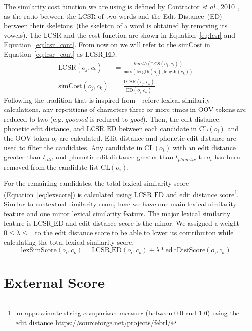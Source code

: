 \documentclass[a4paper,onesided,12pt]{report}
\begin{document}
The similarity cost function we are using is defined by Contractor \textit{et al.}, 2010~\cite{Contractor:2010:UCN:1944566.1944588}, as the ratio between the LCSR of two words and the Edit Distance~(ED) between their skeletons~(the skeleton of a word is obtained by removing its vowels). The LCSR and the cost function are shown in Equation~\ref{eq:lcsr} and Equation~\ref{eq:lcsr_cont}. From now on we will refer to the simCost in Equation~\ref{eq:lcsr_cont} as $\text{LCSR\_ED}$.
\begin{align}
\text{LCSR}(o_j,c_k) &= \frac{length(\text{LCS}(o_j,c_k))}{\text{max}(\text{length}(o_j),\text{length}(c_k))} \label{eq:lcsr}      \\
\text{simCost} (o_j,c_k) &= \frac{\text{LCSR}(o_j,c_k)}{\text{ED}(o_j,c_k)} \label{eq:lcsr_cont}
\end{align}
Following the tradition that is inspired from~\cite{Kaufmann2010} before lexical similarity calculations, any repetitions of characters three or more times in OOV tokens are reduced to two (e.g. \emph{goooood} is reduced to \emph{good}). Then, the edit distance, phonetic edit distance, and $\text{LCSR\_ED}$ between each candidate in $\text{CL}(o_{i})$ and the OOV token $o_i$ are calculated. Edit distance and phonetic edit distance are used to filter the candidates. Any candidate in $\text{CL}(o_{i})$ with an edit distance greater than $t_{edit}$ and phonetic edit distance greater than $t_{phonetic}$ to $o_i$ has been removed from the candidate list $\text{CL}(o_{i})$.

For the remaining candidates, the total lexical similarity score (Equation~\ref{eq:lexscore}) is calculated using $\text{LCSR\_ED}$ and edit distance score\footnote{an approximate string comparison measure (between 0.0 and 1.0) using the edit distance https://sourceforge.net/projects/febrl/}. Similar to contextual similarity score, here we have one main lexical similarity feature and one minor lexical similarity feature. The major lexical similarity feature is $\text{LCSR\_ED}$ and edit distance score is the minor. We assigned a weight $0 \leq \lambda \leq 1$ to the edit distance score to be able to lower its contribuiton while calculating the total lexical similarity score.
\begin{equation}
\text{lexSimScore}(o_i,c_k) = \text{LCSR\_ED}(o_i,c_k) + \lambda * \text{editDistScore}(o_i,c_k)
\label{eq:lexscore}
\end{equation}

\section{External Score}
\end{document}
